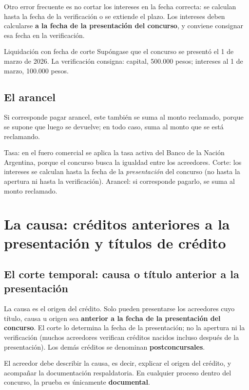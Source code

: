 \documentclass[12pt,oneside]{book}
\begin{document}
Otro error frecuente es no cortar los intereses en la fecha correcta: se calculan hasta la fecha de la verificación o se extiende el plazo. Los intereses deben calcularse \textbf{a la fecha de la presentación del concurso}, y conviene consignar esa fecha en la verificación.

\begin{example}{Liquidación con fecha de corte}
Supóngase que el concurso se presentó el 1 de marzo de 2026. La verificación consigna: capital, 500.000 pesos; intereses al 1 de marzo, 100.000 pesos.
\end{example}

\subsection{El arancel}

Si corresponde pagar arancel, este también se suma al monto reclamado, porque se supone que luego se devuelve; en todo caso, suma al monto que se está reclamando.

\begin{important}
Tasa: en el fuero comercial se aplica la tasa activa del Banco de la Nación Argentina, porque el concurso busca la igualdad entre los acreedores. Corte: los intereses se calculan hasta la fecha de la \emph{presentación} del concurso (no hasta la apertura ni hasta la verificación). Arancel: si corresponde pagarlo, se suma al monto reclamado.
\end{important}

\section{La causa: créditos anteriores a la presentación y títulos de crédito}

\subsection{El corte temporal: causa o título anterior a la presentación}

La causa es el origen del crédito. Solo pueden presentarse los acreedores cuyo título, causa u origen sea \textbf{anterior a la fecha de la presentación del concurso}. El corte lo determina la fecha de la presentación; no la apertura ni la verificación (muchos acreedores verifican créditos nacidos incluso después de la presentación). Los demás créditos se denominan \textbf{postconcursales}.

El acreedor debe describir la causa, es decir, explicar el origen del crédito, y acompañar la documentación respaldatoria. En cualquier proceso dentro del concurso, la prueba es únicamente \textbf{documental}.
\end{document}
